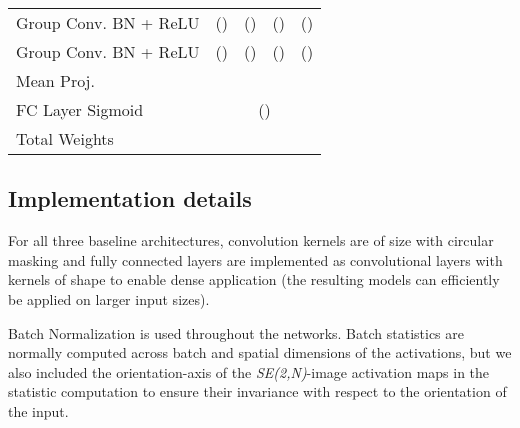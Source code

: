 \documentclass[twocolumn,final]{article}
\newcommand{\se}[1]{\textit{SE(#1)}}
\newcommand{\cellFormat}{\scriptsize \fontsize{7pt}{0pt}}
\newlength{\cellWidth}   \setlength{\cellWidth}{0.14\columnwidth}
\begin{document}
\begin{table}[ht!]
\begin{tabular}{p{} || p{\cellWidth}  p{\cellWidth} p{\cellWidth} p{\cellWidth}}
 \scriptsize \centering Group Conv. \newline BN + ReLU
& \cellFormat   \newline ()
& \cellFormat   \newline ()
& \cellFormat    \newline ()
& \cellFormat   \newline ()
\\

\scriptsize \centering Group Conv. \newline BN + ReLU
& \cellFormat   \newline ()
& \cellFormat   \newline ()
& \cellFormat   \newline ()
& \cellFormat  \newline ()
\\

\scriptsize \centering Mean Proj.
& \multicolumn{4}{c}{ \cellFormat  }
\\

\scriptsize \centering FC Layer \newline Sigmoid 
& \multicolumn{4}{c}{ \cellFormat  () }
\\\hline

\scriptsize \centering Total \newline Weights
& \multicolumn{1}{c}{ \scriptsize }
& \multicolumn{1}{c}{ \scriptsize  }
& \multicolumn{1}{c}{ \scriptsize  }
& \multicolumn{1}{c}{ \scriptsize  }

\end{tabular}
\label{tab:pcamArchitecture} 
\end{table}

\subsection{Implementation details}
For all three baseline architectures, convolution kernels are of size  with circular masking and fully connected layers are implemented as convolutional layers with kernels of shape  to enable dense application (the resulting models can efficiently be applied on larger input sizes).

Batch Normalization \citep{ioffe2015batch} is used throughout the networks.
Batch statistics are normally computed across batch and spatial dimensions of the activations, but we also included the orientation-axis of the \se{2,N}-image activation maps in the statistic computation to ensure their invariance with respect to the orientation of the input.
\end{document}
